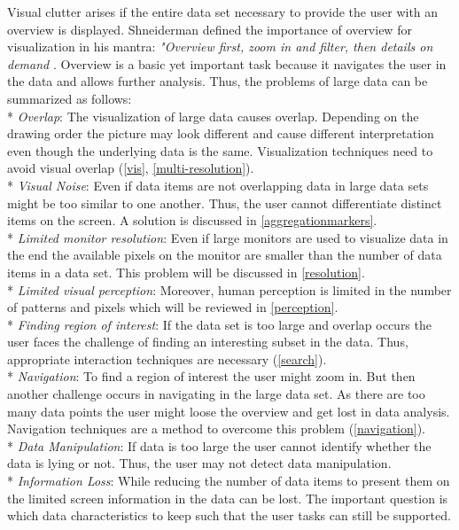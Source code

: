  Visual clutter arises if the entire data set necessary to provide the user with an overview is displayed. Shneiderman defined the importance of overview for visualization in his mantra: \textit{"Overview first, zoom in and filter, then details on demand}  \cite{Paterno1997, Shneiderman2008, Keim2008}. Overview is a basic yet important task because it navigates the user in the data and allows further analysis. Thus, the problems of large data can be summarized as follows: 
\\*
\textit{Overlap}: 
The visualization of large data causes overlap. Depending on the drawing order the picture may look different and cause different interpretation even though the underlying data is the same. Visualization techniques need to avoid visual overlap (\ref{vis}, \ref{multi-resolution}). 
\\*
\textit{Visual Noise}: 
Even if data items are not overlapping data in large data sets might be too similar to one another. Thus, the user cannot differentiate distinct items on the screen. A solution is discussed in \ref{aggregationmarkers}.
\\*
\textit{Limited monitor resolution}:
Even if large monitors are used to visualize data in the end the available pixels on the monitor are smaller than the number of data items in a data set. This problem will be discussed in \ref{resolution}.
\\*
\textit{Limited visual perception}:
Moreover, human perception is limited in the number of patterns and pixels which will be reviewed in \ref{perception}.
\\*
\textit{Finding region of interest}:
If the data set is too large and overlap occurs the user faces the challenge of finding an interesting subset in the data. Thus, appropriate interaction techniques are necessary (\ref{search}).
\\*
\textit{Navigation}:
To find a region of interest the user might zoom in. But then another challenge occurs in navigating in the large data set. As there are too many data points the user might loose the overview and get lost in data analysis. Navigation techniques are a method to overcome this problem (\ref{navigation}).
\\*
\textit{Data Manipulation}:
If data is too large the user cannot identify whether the data is lying or not. Thus, the user may not detect data manipulation.
\\*
\textit{Information Loss}:
While reducing the number of data items to present them on the limited screen information in the data can be lost. The important question is which data characteristics to keep such that the user tasks can still be supported.
